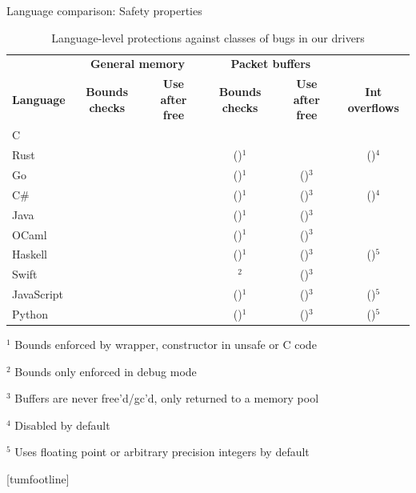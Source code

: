 \documentclass[NET,english,aspectratio=169,notitleframe]{tumbeamer}
\newcommand{\cmark}{\textcolor{TUMDarkGreen}{\ding{51}}}%
\newcommand{\xmark}{\textcolor{TUMDarkRed}{\ding{55}}}%
\begin{document}
\begin{frame}{Language comparison: Safety properties}
\begin{table}[t]
 \setlength{\tabcolsep}{1.3mm}
	\centering
	\footnotesize
	\begin{tabular}{lccccc}
		& \multicolumn{2}{c}{\textbf{General memory}} & \multicolumn{2}{c}{\hspace{-1em}\textbf{Packet buffers}}  \\
		\textbf{Language} & \textbf{Bounds checks} & \textbf{Use after free}  & \textbf{Bounds checks} & \textbf{Use after free} & \textbf{Int overflows} \\
		\toprule
		C & \xmark & \xmark & \xmark & \xmark & \xmark \\
		Rust & \cmark & \cmark & (\cmark)$^1$ & \cmark & (\cmark)$^4$ \\
		Go & \cmark & \cmark & (\cmark)$^1$ & (\cmark)$^3$ & \xmark \\
		C\# & \cmark & \cmark & (\cmark)$^1$ & (\cmark)$^3$ & (\cmark)$^4$ \\
		Java & \cmark & \cmark & (\cmark)$^1$ & (\cmark)$^3$ & \xmark \\
		OCaml & \cmark & \cmark & (\cmark)$^1$ & (\cmark)$^3$ & \xmark \\
		Haskell & \cmark & \cmark & (\cmark)$^1$ & (\cmark)$^3$ & (\cmark)$^5$ \\
		Swift & \cmark & \cmark & \xmark$^2$ & (\cmark)$^3$ & \cmark \\
		JavaScript & \cmark & \cmark & (\cmark)$^1$ & (\cmark)$^3$ & (\cmark)$^5$ \\
		Python & \cmark & \cmark & (\cmark)$^1$ & (\cmark)$^3$ & (\cmark)$^5$ \\
		\bottomrule
	\end{tabular}
	\begin{tablenotes}
	\tiny
	\item $^1$ Bounds enforced by wrapper, constructor in unsafe or C code
	\item $^2$ Bounds only enforced in debug mode
	\item $^3$ Buffers are never free'd/gc'd, only returned to a memory pool
	\item $^4$ Disabled by default
	\item $^5$ Uses floating point or arbitrary precision integers by default
	\end{tablenotes}
	\caption{Language-level protections against classes of bugs in our drivers}
	\label{tbl:lang-safety}
	\vspace{-3em}
\end{table}
\end{frame}
[tumfootline]
\end{document}
